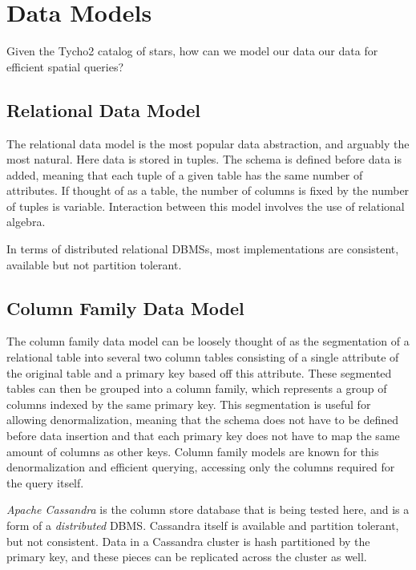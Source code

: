 \section{Data Models}\label{sec:dataModels}
Given the Tycho2 catalog of stars, how can we model our data our data for efficient spatial queries?

\subsection{Relational Data Model}\label{subsec:relationalDataModel}
The relational data model is the most popular data abstraction, and arguably the most natural.
Here data is stored in tuples.
The schema is defined before data is added, meaning that each tuple of a given table has the same number of attributes.
If thought of as a table, the number of columns is fixed by the number of tuples is variable.
Interaction between this model involves the use of relational algebra.

In terms of distributed relational DBMSs, most implementations are consistent, available but not partition tolerant.

\subsection{Column Family Data Model}\label{subsec:columnFamilyDataModel}
The column family data model can be loosely thought of as the segmentation of a relational table into several two
column tables consisting of a single attribute of the original table and a primary key based off this attribute.
These segmented tables can then be grouped into a column family, which represents a group of columns indexed by the
same primary key.
This segmentation is useful for allowing denormalization, meaning that the schema does not have to be defined before
data insertion and that each primary key does not have to map the same amount of columns as other keys.
Column family models are known for this denormalization and efficient querying, accessing only the columns required for
the query itself.

\textit{Apache Cassandra} is the column store database that is being tested here, and is a form of a
\textit{distributed} DBMS\@.
Cassandra itself is available and partition tolerant, but not consistent.
Data in a Cassandra cluster is hash partitioned by the primary key, and these pieces can be replicated across the
cluster as well.

